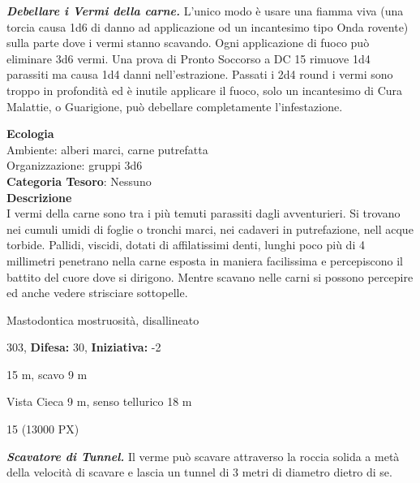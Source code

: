 \begin{multicols}{2}
{\emph{\textbf{Debellare i Vermi della carne.}} L'unico modo è usare una fiamma viva (una torcia causa 1d6 di danno ad applicazione od un incantesimo tipo Onda rovente) sulla parte dove i vermi stanno scavando. Ogni applicazione di fuoco può eliminare 3d6 vermi. Una prova di Pronto Soccorso a DC 15 rimuove 1d4 parassiti ma causa 1d4 danni nell'estrazione. Passati i 2d4 round i vermi sono troppo in profondità ed è inutile applicare il fuoco, solo un incantesimo di Cura Malattie, o Guarigione, può debellare completamente l'infestazione.

\textbf{Ecologia}\\
Ambiente: alberi marci, carne putrefatta\\
Organizzazione: gruppi 3d6\\
\textbf{Categoria Tesoro}: Nessuno\\
\textbf{Descrizione}\\
I vermi della carne sono tra i più temuti parassiti dagli avventurieri. Si trovano nei cumuli umidi di foglie o tronchi marci, nei cadaveri in putrefazione, nell acque torbide. Pallidi, viscidi, dotati di affilatissimi denti, lunghi poco più di 4 millimetri penetrano nella carne esposta in maniera facilissima e percepiscono il battito del cuore dove si dirigono. Mentre scavano nelle carni si possono percepire ed anche vedere strisciare sottopelle.

\noindent
\begin{description}[noitemsep, topsep=0pt, parsep=0pt, partopsep=0pt, leftmargin=0cm, labelwidth=2.2cm]
	\item[\textbf{Taglia/Tipo:}] Mastodontica mostruosità, disallineato
	\item[\textbf{Caratt.:}] 
	\item[\textbf{Punti Ferita:}] 303,  \textbf{Difesa:} 30,  \textbf{Iniziativa:} -2
	\item[\textbf{Movimento:}] 15 m, scavo 9 m
	\item[\textbf{Tiri Salvez.:}] 
	\item[\textbf{Sensi:}] Vista Cieca 9 m, senso tellurico 18 m
	\item[\textbf{Sfida:}] 15 (13000 PX)\smallskip
\end{description}

\emph{\textbf{Scavatore di Tunnel.}} Il verme può scavare attraverso la roccia solida a metà della velocità di scavare e lascia un tunnel di 3 metri di diametro dietro di se.

}
\end{multicols}
